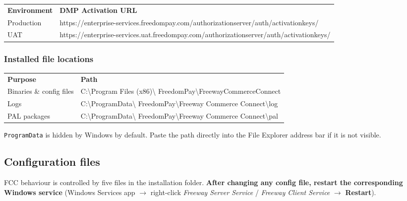 \documentclass[a4paper,10pt]{article}
\begin{document}
\begin{center}
\renewcommand{\arraystretch}{1.3}\small
\begin{tabularx}{\textwidth}{L{22mm} X}
\color{white}\textbf{Environment} &
\color{white}\textbf{DMP Activation URL}\\
Production & \scriptsize\ttfamily
https://enterprise-services.freedompay.com/authorizationserver/auth/activationkeys/\\
UAT & \scriptsize\ttfamily
https://enterprise-services.uat.freedompay.com/authorizationserver/auth/activationkeys/\\
\end{tabularx}
\end{center}

\subsubsection*{Installed file locations}

\begin{center}
\renewcommand{\arraystretch}{1.3}\small
\begin{tabularx}{\textwidth}{L{34mm} X}
\color{white}\textbf{Purpose} &
\color{white}\textbf{Path}\\
Binaries \& config files &
\ttfamily C:\textbackslash Program Files (x86)\textbackslash
FreedomPay\textbackslash FreewayCommerceConnect\\
Logs & \ttfamily C:\textbackslash ProgramData\textbackslash
FreedomPay\textbackslash Freeway Commerce Connect\textbackslash log\\
PAL packages & \ttfamily C:\textbackslash ProgramData\textbackslash
FreedomPay\textbackslash Freeway Commerce Connect\textbackslash pal\\
\end{tabularx}
\end{center}

\begin{wkwarn}
\texttt{ProgramData} is hidden by Windows by default. Paste the path
directly into the File Explorer address bar if it is not visible.
\end{wkwarn}

\subsection{Configuration files}\label{sec:config}

FCC behaviour is controlled by five files in the installation folder.
\textbf{After changing any config file, restart the corresponding Windows
service} (Windows Services app $\rightarrow$ right-click
\emph{Freeway Server Service} / \emph{Freeway Client Service}
$\rightarrow$ \textbf{Restart}).
\end{document}

